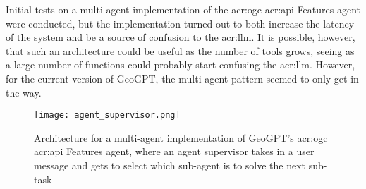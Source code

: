Initial tests on a multi-agent implementation of the \acrshort{acr:ogc} \acrshort{acr:api} Features agent were conducted, but the implementation turned out to both increase the latency of the system and be a source of confusion to the \acrshort{acr:llm}. It is possible, however, that such an architecture could be useful as the number of tools grows, seeing as a large number of functions could probably start confusing the \acrshort{acr:llm}. However, for the current version of GeoGPT, the multi-agent pattern seemed to only get in the way.

\begin{figure}
    \centering
    \texttt{[image: agent\_supervisor.png]}
    \caption[Architecture for a multi-agent implementation of GeoGPT's OGC API Features agent]{Architecture for a multi-agent implementation of GeoGPT's \acrshort{acr:ogc} \acrshort{acr:api} Features agent, where an agent supervisor takes in a user message and gets to select which sub-agent is to solve the next sub-task}
    \label{fig:agent-supervisor}
\end{figure}
